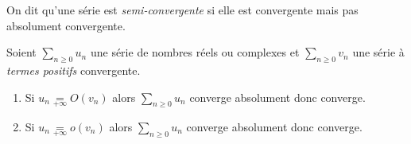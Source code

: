 \documentclass[french,11pt,twoside]{VcCours}
\newcommand{\Sum}[2]{\ensuremath{\textstyle{\sum\limits_{#1}^{#2}}}}
\begin{document}
\begin{Definition}{} On dit qu'une série est \emph{semi-convergente} si elle est convergente mais pas absolument convergente.
\end{Definition}



\begin{Theoreme}{} Soient $\Sum{n \geq 0}{} u_n$ une série de nombres réels ou complexes et $\Sum{n \geq 0}{} v_n$ une série à \emph{termes positifs} convergente.

\begin{enumerate}
\item Si $u_n \underset{+ \infty}{=} O(v_n)$ alors $\Sum{n \geq 0}{} u_n$ converge absolument donc converge.
\item Si $u_n \underset{+ \infty}{=} o(v_n)$ alors $\Sum{n \geq 0}{} u_n$ converge absolument donc converge.
\end{enumerate}
\end{Theoreme}

\begin{Demonstration}{}

%
%
%


\newpage

\vspace*{6cm}

\end{Demonstration}
\end{document}
